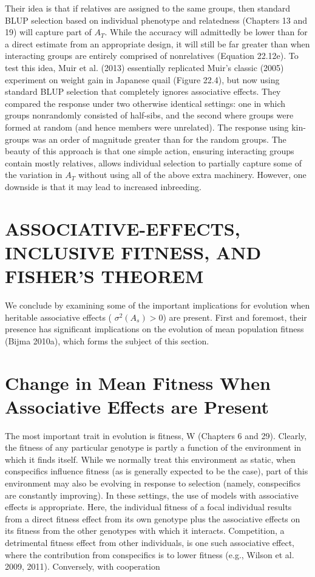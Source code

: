 \documentclass{article}
\begin{document}
Their idea is that if relatives are assigned to the same groups, then standard BLUP selection based on individual phenotype and relatedness (Chapters 13 and 19) will capture part of  $ A_{T} $. While the accuracy will admittedly be lower than for a direct estimate from an appropriate design, it will still be far greater than when interacting groups are entirely comprised of nonrelatives (Equation 22.12e). To test this idea, Muir et al. (2013) essentially replicated Muir's classic (2005) experiment on weight gain in Japanese quail (Figure 22.4), but now using standard BLUP selection that completely ignores associative effects. They compared the response under two otherwise identical settings: one in which groups nonrandomly consisted of half-sibs, and the second where groups were formed at random (and hence members were unrelated). The response using kin-groups was an order of magnitude greater than for the random groups. The beauty of this approach is that one simple action, ensuring interacting groups contain mostly relatives, allows individual selection to partially capture some of the variation in  $ A_{T} $ without using all of the above extra machinery. However, one downside is that it may lead to increased inbreeding.

\section{ASSOCIATIVE-EFFECTS, INCLUSIVE FITNESS, AND FISHER'S THEOREM}
We conclude by examining some of the important implications for evolution when heritable associative effects ( $ \sigma^{2}(A_{s}) > 0 $) are present. First and foremost, their presence has significant implications on the evolution of mean population fitness (Bijma 2010a), which forms the subject of this section.

\section{Change in Mean Fitness When Associative Effects are Present}
The most important trait in evolution is fitness, W (Chapters 6 and 29). Clearly, the fitness of any particular genotype is partly a function of the environment in which it finds itself. While we normally treat this environment as static, when conspecifics influence fitness (as is generally expected to be the case), part of this environment may also be evolving in response to selection (namely, conspecifics are constantly improving). In these settings, the use of models with associative effects is appropriate. Here, the individual fitness of a focal individual results from a direct fitness effect from its own genotype plus the associative effects on its fitness from the other genotypes with which it interacts. Competition, a detrimental fitness effect from other individuals, is one such associative effect, where the contribution from conspecifics is to lower fitness (e.g., Wilson et al. 2009, 2011). Conversely, with cooperation
\end{document}
